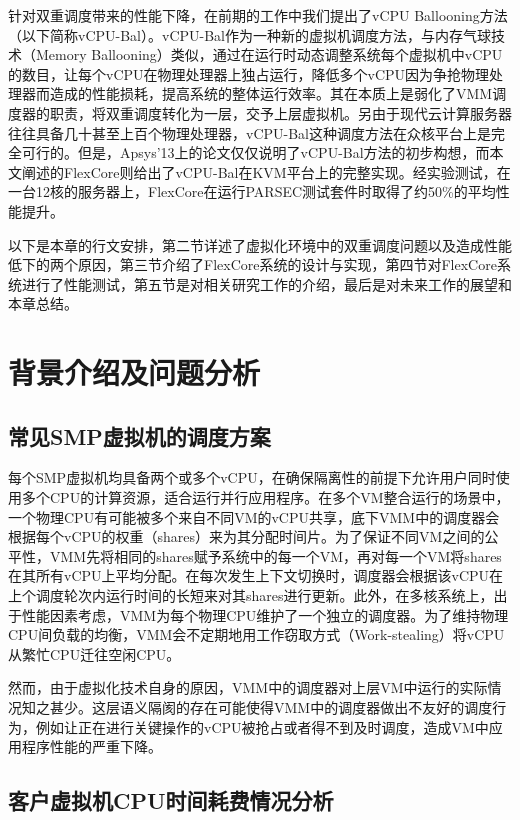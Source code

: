 针对双重调度带来的性能下降，在前期的工作中我们提出了vCPU Ballooning方法（以下简称vCPU-Bal）\cite{song2013schedule}。vCPU-Bal作为一种新的虚拟机调度方法，与内存气球技术（Memory Ballooning）类似\cite{waldspurger2002memory}，通过在运行时动态调整系统每个虚拟机中vCPU的数目，让每个vCPU在物理处理器上独占运行，降低多个vCPU因为争抢物理处理器而造成的性能损耗，提高系统的整体运行效率。其在本质上是弱化了VMM调度器的职责，将双重调度转化为一层，交予上层虚拟机。另由于现代云计算服务器往往具备几十甚至上百个物理处理器，vCPU-Bal这种调度方法在众核平台上是完全可行的。但是，Apsys'13上的论文仅仅说明了vCPU-Bal方法的初步构想，而本文阐述的FlexCore则给出了vCPU-Bal在KVM平台上的完整实现。经实验测试，在一台12核的服务器上，FlexCore在运行PARSEC测试套件时取得了约50\%的平均性能提升。

以下是本章的行文安排，第二节详述了虚拟化环境中的双重调度问题以及造成性能低下的两个原因，第三节介绍了FlexCore系统的设计与实现，第四节对FlexCore系统进行了性能测试，第五节是对相关研究工作的介绍，最后是对未来工作的展望和本章总结。



\section{背景介绍及问题分析}

\subsection{常见SMP虚拟机的调度方案}

每个SMP虚拟机均具备两个或多个vCPU，在确保隔离性的前提下允许用户同时使用多个CPU的计算资源，适合运行并行应用程序。在多个VM整合运行的场景中，一个物理CPU有可能被多个来自不同VM的vCPU共享，底下VMM中的调度器会根据每个vCPU的权重（shares）来为其分配时间片。为了保证不同VM之间的公平性，VMM先将相同的shares赋予系统中的每一个VM，再对每一个VM将shares在其所有vCPU上平均分配。在每次发生上下文切换时，调度器会根据该vCPU在上个调度轮次内运行时间的长短来对其shares进行更新。此外，在多核系统上，出于性能因素考虑，VMM为每个物理CPU维护了一个独立的调度器。为了维持物理CPU间负载的均衡，VMM会不定期地用工作窃取方式（Work-stealing）将vCPU从繁忙CPU迁往空闲CPU\cite{vsphere41}。

然而，由于虚拟化技术自身的原因，VMM中的调度器对上层VM中运行的实际情况知之甚少。这层语义隔阂\cite{chen2001virtual}的存在可能使得VMM中的调度器做出不友好的调度行为，例如让正在进行关键操作的vCPU被抢占或者得不到及时调度，造成VM中应用程序性能的严重下降。

\subsection{客户虚拟机CPU时间耗费情况分析}

